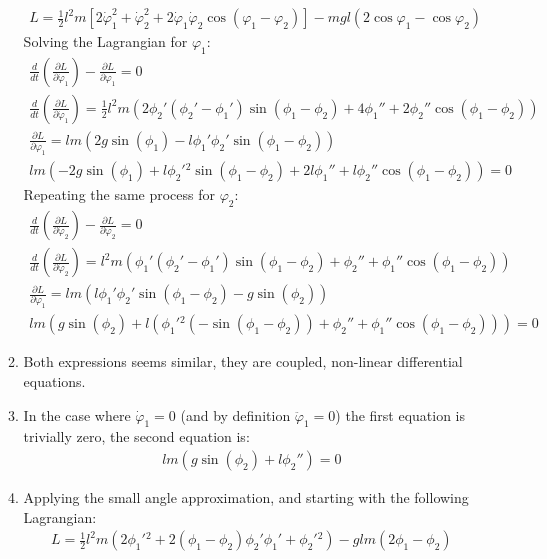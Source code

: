 \documentclass[12pt]{article}
\newcommand{\p}[2]{\frac{\partial #1}{\partial #2}}
\newcommand{\der}[2]{\frac{d #1}{d #2}}
\newcommand{\vp}{\varphi}
\newcommand{\dvp}{\dot{\varphi}}
\newcommand{\ddvp}{\ddot{\varphi}}
\begin{document}
\begin{enumerate}
\begin{enumerate}
\begin{gather*}
        L=\frac{1}{2}l^2 m\left[2\dvp_1^2+\dvp_2^2+2\dvp_1\dvp_2\cos(\vp_1-\vp_2)\right]-mgl(2\cos\vp_1-\cos\vp_2)
      \end{gather*}
      Solving the Lagrangian for $\vp_1$:
      \begin{gather*}
        \der{}{t}\left(\p{L}{\dvp_1}\right)-\p{L}{\vp_1}=0\\
        \der{}{t}\left(\p{L}{\dvp_1}\right)=\frac{1}{2} l^2 m \left(2 \phi _2' \left(\phi _2'-\phi _1'\right) \sin \left(\phi _1-\phi _2\right)+4 \phi _1''+2 \phi _2'' \cos \left(\phi _1-\phi _2\right)\right)\\
        \p{L}{\vp_1}=l m \left(2 g \sin \left(\phi _1\right)-l \phi _1' \phi _2' \sin \left(\phi _1-\phi _2\right)\right)\\
        l m \left(-2 g \sin \left(\phi _1\right)+l \phi _2'{}^2 \sin \left(\phi _1-\phi _2\right)+2 l \phi _1''+l \phi _2'' \cos \left(\phi _1-\phi _2\right)\right)=0
      \end{gather*}
      Repeating the same process for $\vp_2$:
      \begin{gather*}
        \der{}{t}\left(\p{L}{\dvp_2}\right)-\p{L}{\vp_2}=0\\
        \der{}{t}\left(\p{L}{\dvp_2}\right)=l^2 m \left(\phi _1' \left(\phi _2'-\phi _1'\right) \sin \left(\phi _1-\phi _2\right)+\phi _2''+\phi _1'' \cos \left(\phi _1-\phi _2\right)\right)\\
        \p{L}{\vp_1}=l m \left(l \phi _1' \phi _2' \sin \left(\phi _1-\phi _2\right)-g \sin \left(\phi _2\right)\right)\\
        l m \left(g \sin \left(\phi _2\right)+l \left(\phi _1'{}^2 \left(-\sin \left(\phi _1-\phi _2\right)\right)+\phi _2''+\phi _1'' \cos \left(\phi _1-\phi _2\right)\right)\right)=0
      \end{gather*}
      \item Both expressions seems similar, they are coupled, non-linear differential equations.
      \item In the case where $\dvp_1=0$ (and by definition $\ddvp_1=0$) the first equation is trivially zero, the second equation is:
      \begin{gather*}
        l m \left(g \sin \left(\phi _2\right)+l \phi _2''\right)=0
      \end{gather*}
      \item Applying the small angle approximation, and starting with the following Lagrangian:
      \begin{gather*}
        L=\frac{1}{2} l^2 m \left(2 \phi _1'{}^2+2 \left(\phi _1-\phi _2\right) \phi _2' \phi _1'+\phi _2'{}^2\right)-g l m \left(2 \phi _1-\phi _2\right)\\

\end{gather*}
\end{enumerate}
\end{enumerate}
\end{document}
